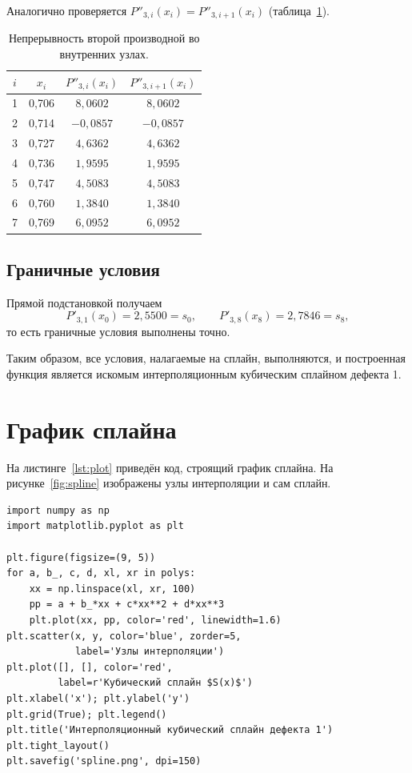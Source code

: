 \documentclass[a4paper, final]{article}
\begin{document}
Аналогично проверяется $P''_{3,i}(x_i) = P''_{3,i+1}(x_i)$
(таблица~\ref{tab:check_der2}).

\begin{table}[h!]
\centering
\small
\begin{tabular}{|c|c|c|c|}
\hline
$i$ & $x_i$ & $P''_{3,i}(x_i)$ & $P''_{3,i+1}(x_i)$ \\
\hline
1 & 0,706 & $8{,}0602$   & $8{,}0602$ \\
2 & 0,714 & $-0{,}0857$  & $-0{,}0857$ \\
3 & 0,727 & $4{,}6362$   & $4{,}6362$ \\
4 & 0,736 & $1{,}9595$   & $1{,}9595$ \\
5 & 0,747 & $4{,}5083$   & $4{,}5083$ \\
6 & 0,760 & $1{,}3840$   & $1{,}3840$ \\
7 & 0,769 & $6{,}0952$   & $6{,}0952$ \\
\hline
\end{tabular}
\caption{Непрерывность второй производной во внутренних узлах.}
\label{tab:check_der2}
\end{table}

\subsection{Граничные условия}

Прямой подстановкой получаем
\[
P'_{3,1}(x_0) = 2{,}5500 = s_0, \qquad
P'_{3,8}(x_8) = 2{,}7846 = s_8,
\]
то есть граничные условия выполнены точно.

Таким образом, все условия, налагаемые на сплайн, выполняются, и построенная
функция является искомым интерполяционным кубическим сплайном дефекта 1.

\newpage

\section{График сплайна}

На листинге~\ref{lst:plot} приведён код, строящий график сплайна. На
рисунке~\ref{fig:spline} изображены узлы интерполяции и сам сплайн.

\begin{lstlisting}[caption={Построение графика сплайна}, label=lst:plot]
import numpy as np
import matplotlib.pyplot as plt

plt.figure(figsize=(9, 5))
for a, b_, c, d, xl, xr in polys:
    xx = np.linspace(xl, xr, 100)
    pp = a + b_*xx + c*xx**2 + d*xx**3
    plt.plot(xx, pp, color='red', linewidth=1.6)
plt.scatter(x, y, color='blue', zorder=5,
            label='Узлы интерполяции')
plt.plot([], [], color='red',
         label=r'Кубический сплайн $S(x)$')
plt.xlabel('x'); plt.ylabel('y')
plt.grid(True); plt.legend()
plt.title('Интерполяционный кубический сплайн дефекта 1')
plt.tight_layout()
plt.savefig('spline.png', dpi=150)
\end{lstlisting}
\end{document}
